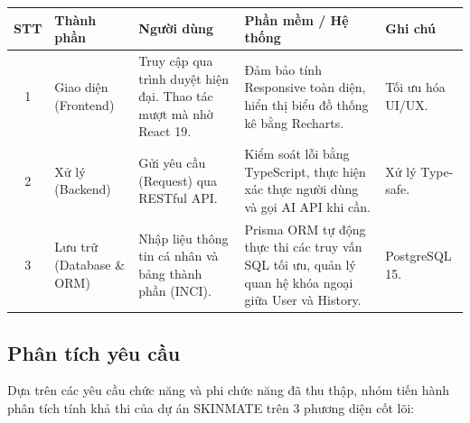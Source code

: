 \documentclass[12pt,a4paper]{article}
\begin{document}
\begin{center}
\renewcommand{\arraystretch}{1.2}
\begin{tabular}{|c|p{3.5cm}|p{4cm}|p{4.5cm}|p{2cm}|}
\hline
\textbf{STT} & \textbf{Thành phần} & \textbf{Người dùng} & \textbf{Phần mềm / Hệ thống} & \textbf{Ghi chú} \\
\hline
1 & Giao diện (Frontend) & Truy cập qua trình duyệt hiện đại. Thao tác mượt mà nhờ React 19. & Đảm bảo tính Responsive toàn diện, hiển thị biểu đồ thống kê bằng Recharts. & Tối ưu hóa UI/UX. \\
\hline
2 & Xử lý (Backend) & Gửi yêu cầu (Request) qua RESTful API. & Kiểm soát lỗi bằng TypeScript, thực hiện xác thực người dùng và gọi AI API khi cần. & Xử lý Type-safe. \\
\hline
3 & Lưu trữ (Database \& ORM) & Nhập liệu thông tin cá nhân và bảng thành phần (INCI). & Prisma ORM tự động thực thi các truy vấn SQL tối ưu, quản lý quan hệ khóa ngoại giữa User và History. & PostgreSQL 15. \\
\hline
\end{tabular}
\end{center}

\subsection{Phân tích yêu cầu}

Dựa trên các yêu cầu chức năng và phi chức năng đã thu thập, nhóm tiến hành phân tích tính khả thi của dự án SKINMATE trên 3 phương diện cốt lõi:
\end{document}
